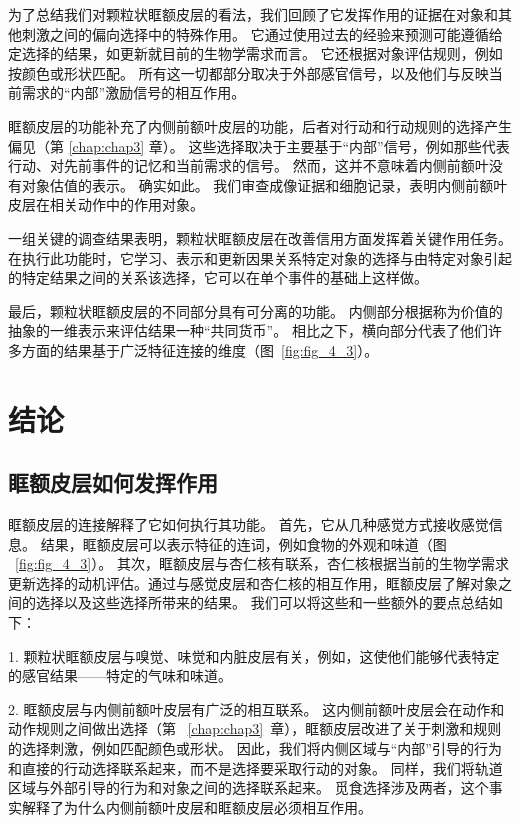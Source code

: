 为了总结我们对颗粒状眶额皮层的看法，我们回顾了它发挥作用的证据在对象和其他刺激之间的偏向选择中的特殊作用。
它通过使用过去的经验来预测可能遵循给定选择的结果，如更新就目前的生物学需求而言。
它还根据对象评估规则，例如按颜色或形状匹配。
所有这一切都部分取决于外部感官信号，以及他们与反映当前需求的“内部”激励信号的相互作用。\par


眶额皮层的功能补充了内侧前额叶皮层的功能，后者对行动和行动规则的选择产生偏见（第 \ref{chap:chap3} 章）。
这些选择取决于主要基于“内部”信号，例如那些代表行动、对先前事件的记忆和当前需求的信号。
然而，这并不意味着内侧前额叶没有对象估值的表示。
确实如此。 我们审查成像证据和细胞记录，表明内侧前额叶皮层在相关动作中的作用对象。\par


一组关键的调查结果表明，颗粒状眶额皮层在改善信用方面发挥着关键作用任务。
在执行此功能时，它学习、表示和更新因果关系特定对象的选择与由特定对象引起的特定结果之间的关系该选择，它可以在单个事件的基础上这样做。\par


最后，颗粒状眶额皮层的不同部分具有可分离的功能。
内侧部分根据称为价值的抽象的一维表示来评估结果一种“共同货币”。
相比之下，横向部分代表了他们许多方面的结果基于广泛特征连接的维度（图~\ref{fig:fig_4_3}）。\par



\section{结论}

\subsection{眶额皮层如何发挥作用}

眶额皮层的连接解释了它如何执行其功能。
首先，它从几种感觉方式接收感觉信息。
结果，眶额皮层可以表示特征的连词，例如食物的外观和味道（图 ~\ref{fig:fig_4_3}）。
其次，眶额皮层与杏仁核有联系，杏仁核根据当前的生物学需求更新选择的动机评估。通过与感觉皮层和杏仁核的相互作用，眶额皮层了解对象之间的选择以及这些选择所带来的结果。
我们可以将这些和一些额外的要点总结如下：\par


1. 颗粒状眶额皮层与嗅觉、味觉和内脏皮层有关，例如，这使他们能够代表特定的感官结果——特定的气味和味道。\par


2. 眶额皮层与内侧前额叶皮层有广泛的相互联系。
这内侧前额叶皮层会在动作和动作规则之间做出选择（第 ~\ref{chap:chap3}~章），眶额皮层改进了关于刺激和规则的选择刺激，例如匹配颜色或形状。
因此，我们将内侧区域与“内部”引导的行为和直接的行动选择联系起来，而不是选择要采取行动的对象。
同样，我们将轨道区域与外部引导的行为和对象之间的选择联系起来。
觅食选择涉及两者，这个事实解释了为什么内侧前额叶皮层和眶额皮层必须相互作用。\par


